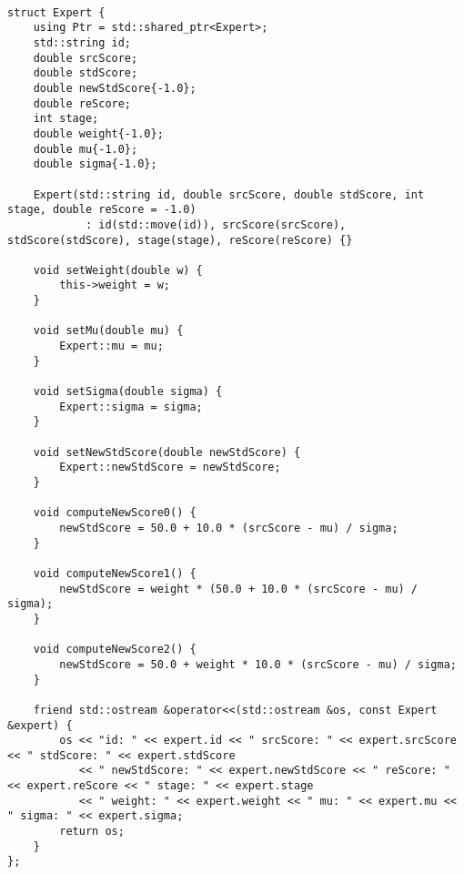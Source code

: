 \documentclass[bwprint]{gmcmthesis}
\begin{document}
\begin{lstlisting}[label=judge,caption={专家类的数据结构定义}]

struct Expert {
    using Ptr = std::shared_ptr<Expert>;
    std::string id;
    double srcScore;
    double stdScore;
    double newStdScore{-1.0};
    double reScore;
    int stage;
    double weight{-1.0};
    double mu{-1.0};
    double sigma{-1.0};

    Expert(std::string id, double srcScore, double stdScore, int stage, double reScore = -1.0)
            : id(std::move(id)), srcScore(srcScore), stdScore(stdScore), stage(stage), reScore(reScore) {}

    void setWeight(double w) {
        this->weight = w;
    }

    void setMu(double mu) {
        Expert::mu = mu;
    }

    void setSigma(double sigma) {
        Expert::sigma = sigma;
    }

    void setNewStdScore(double newStdScore) {
        Expert::newStdScore = newStdScore;
    }

    void computeNewScore0() {
        newStdScore = 50.0 + 10.0 * (srcScore - mu) / sigma;
    }

    void computeNewScore1() {
        newStdScore = weight * (50.0 + 10.0 * (srcScore - mu) / sigma);
    }

    void computeNewScore2() {
        newStdScore = 50.0 + weight * 10.0 * (srcScore - mu) / sigma;
    }

    friend std::ostream &operator<<(std::ostream &os, const Expert &expert) {
        os << "id: " << expert.id << " srcScore: " << expert.srcScore << " stdScore: " << expert.stdScore
           << " newStdScore: " << expert.newStdScore << " reScore: " << expert.reScore << " stage: " << expert.stage
           << " weight: " << expert.weight << " mu: " << expert.mu << " sigma: " << expert.sigma;
        return os;
    }
};
\end{lstlisting}
\end{document}
